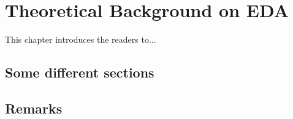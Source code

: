 \chapter{Theoretical Background on EDA}
\label{chap:TheoreticalBackgroundEDA}

\thispagestyle{plain}

\vspace{0.5cm}

\noindent This chapter introduces the readers to...

\section{Some different sections}

\section{Remarks}
